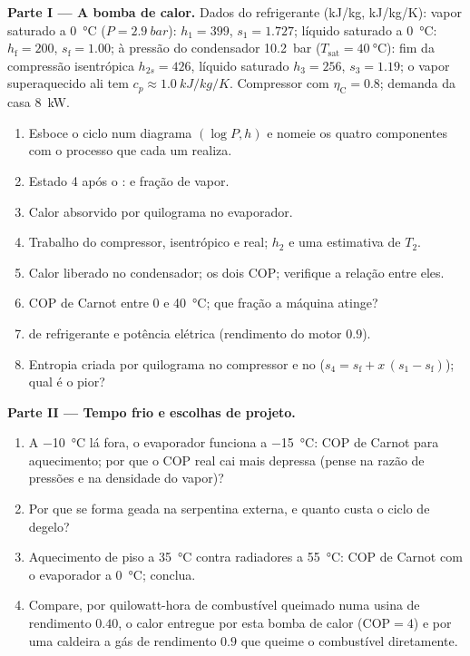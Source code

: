 \begin{problem}\label{pb:b2:open-systems:1}
\textbf{Parte I --- A bomba de calor.}
Dados do refrigerante (\unit{kJ/kg}, \unit{kJ/kg/K}): vapor saturado a
\qty{0}{\celsius} ($P = \qty{2.9}{bar}$): $h_1 = 399$, $s_1 = 1.727$;
líquido saturado a \qty{0}{\celsius}: $h_{\text{f}} = 200$, $s_{\text{f}} = 1.00$;
à pressão do condensador \qty{10.2}{bar} ($T_{\text{sat}} = \qty{40}{\celsius}$):
fim da compressão isentrópica $h_{2s} = 426$, líquido saturado $h_3 = 256$,
$s_3 = 1.19$; o vapor superaquecido ali tem $c_p \approx \qty{1.0}{kJ/kg/K}$.
Compressor com $\eta_{\text{C}} = 0.8$; demanda da casa \qty{8}{kW}.
\begin{enumerate}
  \item Esboce o ciclo num diagrama $(\log P, h)$ e nomeie os quatro
        componentes com o processo que cada um realiza.
  \item Estado 4 após o :  e fração de vapor.
  \item Calor absorvido por quilograma no evaporador.
  \item Trabalho do compressor, isentrópico e real; $h_2$ e uma estimativa de
        $T_2$.
  \item Calor liberado no condensador; os dois COP; verifique a
        relação entre eles.
  \item COP de Carnot entre \qty{0}{} e \qty{40}{\celsius}; que
        fração a máquina atinge?
  \item {} de refrigerante e potência elétrica (rendimento
        do motor $0.9$).
  \item Entropia criada por quilograma no compressor e no
         ($s_4 = s_{\text{f}} + x\,(s_1 - s_{\text{f}})$); qual é
        o pior?
\end{enumerate}

\textbf{Parte II --- Tempo frio e escolhas de projeto.}
\begin{enumerate}[resume]
  \item A \qty{-10}{\celsius} lá fora, o evaporador funciona a
        \qty{-15}{\celsius}: COP de Carnot para aquecimento; por que o COP
        real cai mais depressa (pense na razão de pressões e na
        densidade do vapor)?
  \item Por que se forma geada na serpentina externa, e quanto custa o
        ciclo de degelo?
  \item Aquecimento de piso a \qty{35}{\celsius} contra radiadores a
        \qty{55}{\celsius}: COP de Carnot com o evaporador a
        \qty{0}{\celsius}; conclua.
  \item Compare, por quilowatt-hora de combustível queimado numa usina de
        rendimento $0.40$, o calor entregue por esta bomba de calor ($\mathrm{COP}
        = 4$) e por uma caldeira a gás de rendimento $0.9$ que queime o combustível
        diretamente.
\end{enumerate}


\end{problem}
